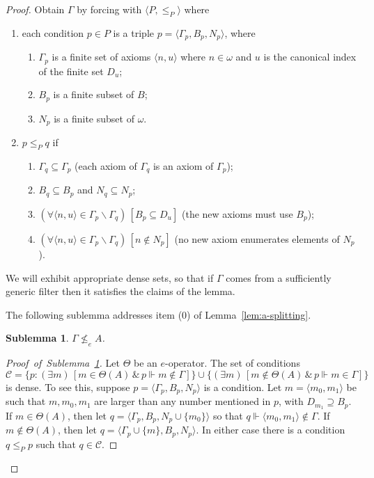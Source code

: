 \documentclass[11pt]{amsart}
\newtheorem{sublemma}{Sublemma}
\newcommand{\QA}[1]{(\forall{#1})\,}
\newcommand{\QE}[1]{(\exists{#1})\,}
\begin{document}
\begin{proof}
Obtain $\Gamma$ by forcing with $\langle P, \leq_P \rangle$ where 
\begin{enumerate}
  \item[I.] each condition $p \in P$ is a triple $p=\langle \Gamma_p, B_p, 
      N_p\rangle$, where 
      
\begin{enumerate}
  \item[-] $\Gamma_p$ is a finite set of axioms $\langle n, u\rangle$ 
      where $n\in \omega$ and $u$ is the canonical index of the finite 
      set $D_u$; 
  \item[-] $B_p$ is a finite subset of $B$;
  \item[-] $N_p$ is a finite subset of $\omega$.
\end{enumerate}
  \item[II.] $p\leq_P q$ if
  \begin{enumerate}
    \item[-] $\Gamma_q \subseteq \Gamma_p$ (each axiom of $\Gamma_q$ is 
        an axiom of $\Gamma_p$);
    \item[-] $B_q \subseteq B_p$ and $N_q \subseteq N_p$;
    \item[-] $\QA{\langle n, u\rangle \in \Gamma_p \smallsetminus 
        \Gamma_q} \left[ B_p \subseteq D_u \right]$ (the new axioms must 
        use $B_p$); 
    \item[-] $\QA{\langle n, u\rangle \in \Gamma_p \smallsetminus 
        \Gamma_q} \left[ n \notin N_p \right]$ (no new axiom enumerates 
        elements of $N_p$). 
  \end{enumerate}
\end{enumerate} 

We will exhibit appropriate dense sets, so that if $\Gamma$ comes from a 
sufficiently generic filter then it satisfies the claims of the lemma.

The following sublemma addresses item (0) of Lemma~\ref{lem:a-splitting}. 

\begin{sublemma}\label{lem:0}
$\Gamma \nleq_e A$.
\end{sublemma}

\begin{proof}[Proof~of~Sublemma~\ref{lem:0}]
Let $\Theta$ be an $e$-operator. The set of conditions 
\[ 
\mathcal{C}=\{p: \QE{m}\left[m \in \Theta(A) \,\&\, p \Vdash m 
\notin \Gamma\right]\} \cup
\{\QE{m}\left[m \notin \Theta(A) \,\&\, p \Vdash m \in \Gamma\right]\}
\]
is dense. To see this, suppose $p=\langle \Gamma_p, B_p, N_p\rangle$ is a 
condition. Let $m=\langle m_0, m_1\rangle$ be such that $m, m_0, m_1$ are 
larger than any number mentioned in $p$, with $D_{m_1} \supseteq B_p$.
If $m \in \Theta(A)$, then let
$q=\langle \Gamma_p, B_p, N_p\cup \{m_0\}\rangle$
so that $q\Vdash \langle m_0, m_1\rangle \notin \Gamma$.
If $m \notin \Theta(A)$, then let $q=\langle \Gamma_p \cup \{m\}, B_p, N_p\rangle$.
In either case there is a condition $q \leq_P p$ such that $q \in \mathcal{C}$. 
\end{proof}


\end{proof}
\end{document}
